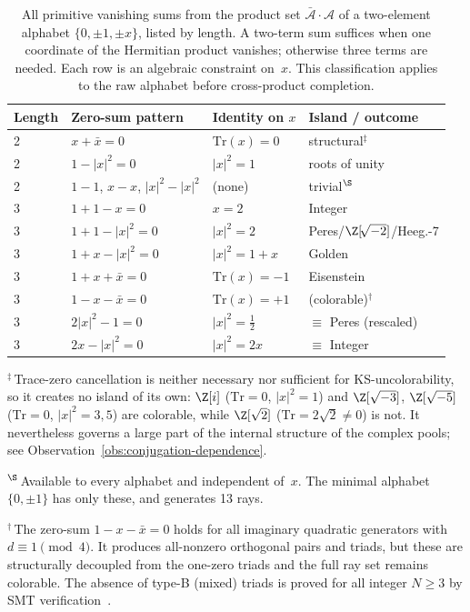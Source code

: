 \begin{table}[h]
\centering
\caption{All primitive vanishing sums from the product set $\bar{\mathcal{A}}
\cdot \mathcal{A}$ of a two-element alphabet $\{0, \pm 1, \pm x\}$, listed by
length.  A two-term sum suffices when one coordinate of the Hermitian product
vanishes; otherwise three terms are needed.  Each row is an algebraic constraint
on~$x$.  This classification applies to the raw alphabet before cross-product
completion.}
\label{tab:two-element}
\footnotesize
\setlength{\tabcolsep}{3pt}
\begin{tabular}{@{}llll@{}}
\toprule
Length & Zero-sum pattern & Identity on $x$ & Island / outcome \\
\midrule
2 & $x + \bar{x} = 0$        & $\mathrm{Tr}(x) = 0$   & structural$^\ddagger$ \\
2 & $1 - |x|^2 = 0$          & $|x|^2 = 1$            & roots of unity \\
2 & $1 - 1$, $x - x$, $|x|^2 - |x|^2$ & (none)        & trivial$^\S$ \\
\midrule
3 & $1 + 1 - x = 0$          & $x = 2$                & Integer \\
3 & $1 + 1 - |x|^2 = 0$      & $|x|^2 = 2$            & Peres/$\Z[\!\sqrt{-2}]$/Heeg.-7 \\
3 & $1 + x - |x|^2 = 0$      & $|x|^2 = 1 + x$        & Golden \\
3 & $1 + x + \bar{x} = 0$    & $\mathrm{Tr}(x) = -1$  & Eisenstein \\
3 & $1 - x - \bar{x} = 0$    & $\mathrm{Tr}(x) = +1$  & (colorable)$^\dagger$ \\
3 & $2|x|^2 - 1 = 0$         & $|x|^2 = \tfrac{1}{2}$ & $\equiv$ Peres (rescaled) \\
3 & $2x - |x|^2 = 0$         & $|x|^2 = 2x$           & $\equiv$ Integer \\
\bottomrule
\end{tabular}

\smallskip
\noindent $^\ddagger$\,Trace-zero cancellation is neither necessary nor sufficient
for KS-uncolorability, so it creates no island of its own: $\Z[i]$
($\mathrm{Tr}=0$, $|x|^2=1$) and $\Z[\sqrt{-3}]$, $\Z[\sqrt{-5}]$
($\mathrm{Tr}=0$, $|x|^2=3,5$) are colorable, while $\Z[\sqrt{2}]$
($\mathrm{Tr} = 2\sqrt2 \neq 0$) is not.  It nevertheless governs a large part of
the internal structure of the complex pools; see
Observation~\ref{obs:conjugation-dependence}.

\noindent $^\S$\,Available to every alphabet and independent of~$x$.  The
minimal alphabet $\{0,\pm1\}$ has only these, and generates 13 rays.

\noindent $^\dagger$\,The zero-sum $1 - x - \bar{x} = 0$ holds for all imaginary
quadratic generators with $d \equiv 1 \pmod{4}$.  It produces all-nonzero
orthogonal pairs and triads, but these are structurally decoupled from the
one-zero triads and the full ray set remains colorable.  The absence of type-B
(mixed) triads is proved for all integer $N \geq 3$ by SMT
verification~\cite{deMouraBjorner2008}.
\end{table}


